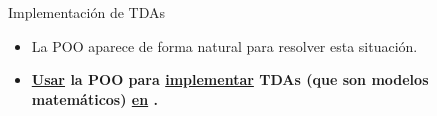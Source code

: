 \documentclass[10pt,envcountsect,spanish]{beamer}
\begin{document}
\begin{frame}{Implementación de TDAs}
\begin{itemize}
	

	
\item La POO aparece de forma natural para resolver esta situación.


\item \small {} 

\centerline{\bf \underline{Usar} la POO para \underline{implementar} TDAs (que son modelos matemáticos) \underline{en} .}

\end{itemize}

\end{frame}
\end{document}
